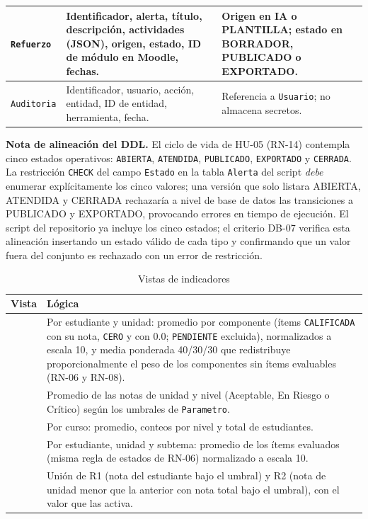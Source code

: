 \documentclass[11pt,a4paper]{article}
\newcommand{\hd}[1]{\textbf{#1}}
\begin{document}
\begin{table}[H]
\begin{tabularx}{\textwidth}{|R{3.4cm}|Y|R{4.2cm}|}
\texttt{Refuerzo} & Identificador, alerta, título, descripción, actividades (JSON), origen, estado, ID de módulo en Moodle, fechas. & Origen en IA o PLANTILLA; estado en BORRADOR, PUBLICADO o EXPORTADO.\\ \hline
\texttt{Auditoria} & Identificador, usuario, acción, entidad, ID de entidad, herramienta, fecha. & Referencia a \texttt{Usuario}; no almacena secretos.\\ \hline
\end{tabularx}
\end{table}

\textbf{Nota de alineación del DDL.} El ciclo de vida de HU-05 (RN-14) contempla cinco estados operativos: \texttt{ABIERTA}, \texttt{ATENDIDA}, \texttt{PUBLICADO}, \texttt{EXPORTADO} y \texttt{CERRADA}. La restricción \texttt{CHECK} del campo \texttt{Estado} en la tabla \texttt{Alerta} del script  \emph{debe} enumerar explícitamente los cinco valores; una versión que solo listara ABIERTA, ATENDIDA y CERRADA rechazaría a nivel de base de datos las transiciones a PUBLICADO y EXPORTADO, provocando errores en tiempo de ejecución. El script del repositorio ya incluye los cinco estados; el criterio DB-07 verifica esta alineación insertando un estado válido de cada tipo y confirmando que un valor fuera del conjunto es rechazado con un error de restricción.

\begin{table}[H]
\centering\small
\caption{Vistas de indicadores}
\begin{tabularx}{\textwidth}{|R{4.6cm}|Y|}
\hline
\hd{Vista} & \hd{Lógica}\\ \hline
{} & Por estudiante y unidad: promedio por componente (ítems \texttt{CALIFICADA} con su nota, \texttt{CERO} y  con 0.0; \texttt{PENDIENTE} excluida), normalizados a escala 10, y media ponderada 40/30/30 que redistribuye proporcionalmente el peso de los componentes sin ítems evaluables (RN-06 y RN-08).\\ \hline
{} & Promedio de las notas de unidad y nivel (Aceptable, En Riesgo o Crítico) según los umbrales de \texttt{Parametro}.\\ \hline
{} & Por curso: promedio, conteos por nivel y total de estudiantes.\\ \hline
{} & Por estudiante, unidad y subtema: promedio de los ítems evaluados (misma regla de estados de RN-06) normalizado a escala 10.\\ \hline
{} & Unión de R1 (nota del estudiante bajo el umbral) y R2 (nota de unidad menor que la anterior con nota total bajo el umbral), con el valor que las activa.\\ \hline
\end{tabularx}
\end{table}
\end{document}
